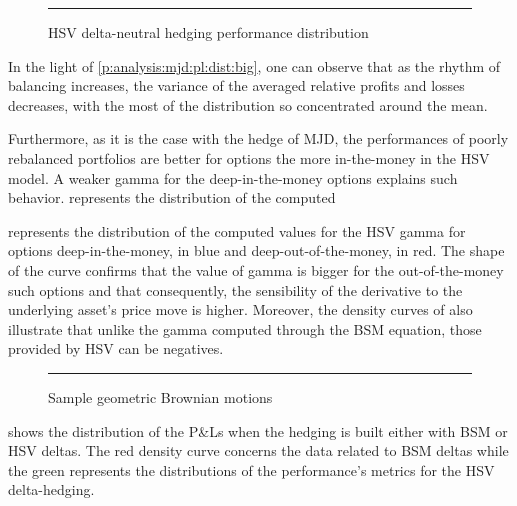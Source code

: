 \documentclass[12pt]{report}
\begin{document}
\begin{figure}[h]
  \centering
  \rule{40mm}{20mm}
  \caption{HSV delta-neutral hedging performance distribution}
  \label{p:analysis:hsv:pl:dist:big}
\end{figure}
         

In the light of \cref{p:analysis:mjd:pl:dist:big}, one can observe that as the rhythm of balancing increases, the variance of the averaged relative profits and losses decreases, with the most of the distribution so concentrated around the mean.



Furthermore, as it is the case with the hedge of MJD, the performances of poorly rebalanced portfolios are better for options the more in-the-money in the HSV model. 
A weaker gamma for the deep-in-the-money options explains such behavior.
 represents the distribution of the computed 

 represents the distribution of the computed values for the HSV gamma for options deep-in-the-money, in blue and deep-out-of-the-money, in red.
The shape of the curve confirms that the value of gamma is bigger for the out-of-the-money such options and that consequently, the sensibility of the derivative to the underlying asset's price move is higher.
Moreover, the density curves of  also illustrate that unlike the gamma computed through the BSM equation, those provided by HSV can be negatives.




\begin{figure}[h]
  \centering
  \rule{40mm}{20mm}
  \caption{Sample geometric Brownian motions}
  \label{p:analysis:hsv:gamma}
\end{figure}








 shows the distribution of the P\&Ls when the hedging is built either with BSM or HSV deltas. The red density curve concerns the data related to BSM deltas while the green represents the distributions of the performance's metrics for the HSV delta-hedging.
\end{document}

